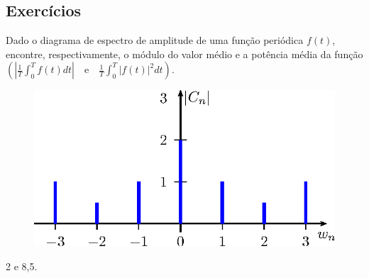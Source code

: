 \subsection*{Exercícios}
\begin{exer}Dado o diagrama de espectro de amplitude de uma função periódica $f(t)$, encontre, respectivamente, o módulo do valor médio e a potência média da função $\left(\left|\frac{1}{T}\int_0^Tf(t)dt\right|\quad\text{e}\quad \frac{1}{T}\int_0^T|f(t)|^2dt\right)$.\\
\begin{figure}[!ht]
\begin{center}
\includegraphics{cap_propriedades_series/pics/figura_4}
\end{center}
\end{figure}

\end{exer}
\begin{resp} 2 e 8,5.
\end{resp}




